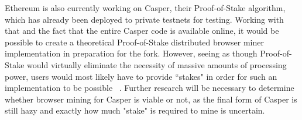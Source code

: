 \documentclass[10pt, conference, compsocconf]{IEEEtran}
\begin{document}
Ethereum is also currently working on Casper, their Proof-of-Stake algorithm, which has already been deployed to private testnets for testing. Working with that and the fact that the entire Casper code is available online, it would be possible to create a theoretical Proof-of-Stake distributed browser miner implementation in preparation for the fork. However, seeing as though Proof-of-Stake would virtually eliminate the necessity of massive amounts of processing power, users would most likely have to provide ``stakes" in order for such an implementation to be possible ~\cite{PoSproof}. Further research will be necessary to determine whether browser mining for Casper is viable or not, as the final form of Casper is still hazy and exactly how much "stake" is required to mine is uncertain.



%
%
\end{document}
